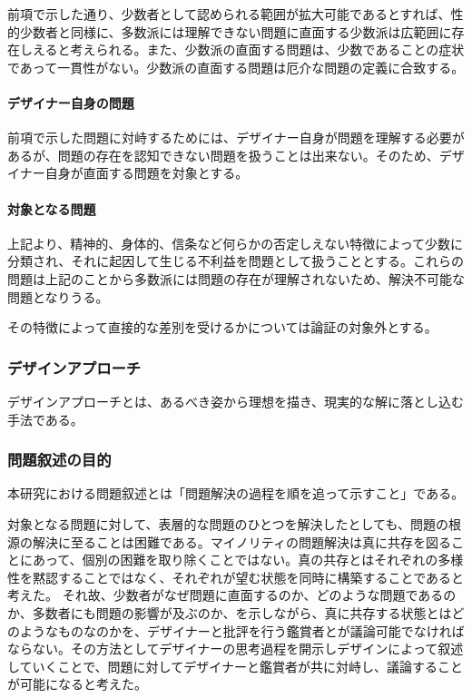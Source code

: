 \documentclass{jsarticle}
\begin{document}
前項で示した通り、少数者として認められる範囲が拡大可能であるとすれば、性的少数者と同様に、多数派には理解できない問題に直面する少数派は広範囲に存在しえると考えられる。また、少数派の直面する問題は、少数であることの症状であって一貫性がない。少数派の直面する問題は厄介な問題の定義に合致する。

\paragraph*{デザイナー自身の問題}

前項で示した問題に対峙するためには、デザイナー自身が問題を理解する必要があるが、問題の存在を認知できない問題を扱うことは出来ない。そのため、デザイナー自身が直面する問題を対象とする。

\paragraph*{対象となる問題}

上記より、精神的、身体的、信条など何らかの否定しえない特徴によって少数に分類され、それに起因して生じる不利益を問題として扱うこととする。これらの問題は上記のことから多数派には問題の存在が理解されないため、解決不可能な問題となりうる。

その特徴によって直接的な差別を受けるかについては論証の対象外とする。
　

\subsubsection{デザインアプローチ}
デザインアプローチとは、あるべき姿から理想を描き、現実的な解に落とし込む手法である。

\subsubsection{問題叙述の目的}
本研究における問題叙述とは「問題解決の過程を順を追って示すこと」である。

対象となる問題に対して、表層的な問題のひとつを解決したとしても、問題の根源の解決に至ることは困難である。マイノリティの問題解決は真に共存を図ることにあって、個別の困難を取り除くことではない。真の共存とはそれぞれの多様性を黙認することではなく、それぞれが望む状態を同時に構築することであると考えた。
それ故、少数者がなぜ問題に直面するのか、どのような問題であるのか、多数者にも問題の影響が及ぶのか、を示しながら、真に共存する状態とはどのようなものなのかを、デザイナーと批評を行う鑑賞者とが議論可能でなければならない。その方法としてデザイナーの思考過程を開示しデザインによって叙述していくことで、問題に対してデザイナーと鑑賞者が共に対峙し、議論することが可能になると考えた。
\end{document}
